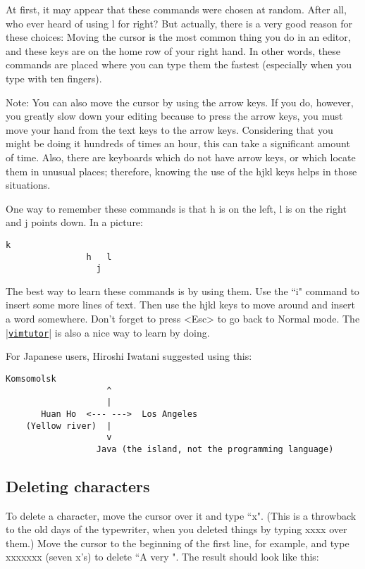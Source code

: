 At first, it may appear that these commands were chosen at random.
After all, who ever heard of using l for right?  But actually, there is a very good reason for these choices: Moving the cursor is the most common thing you do in an editor, and these keys are on the home row of your right hand.
In other words, these commands are placed where you can type them the fastest (especially when you type with ten fingers).

Note:
You can also move the cursor by using the arrow keys.
If you do, however, you greatly slow down your editing because to press the arrow keys, you must move your hand from the text keys to the arrow keys.
Considering that you might be doing it hundreds of times an hour, this can take a significant amount of time.
Also, there are keyboards which do not have arrow keys, or which locate them in unusual places; therefore, knowing the use of the hjkl keys helps in those situations.

One way to remember these commands is that h is on the left, l is on the right and j points down.
In a picture:

\begin{Verbatim}[samepage=true]
				  k
				h   l
				  j
\end{Verbatim}

The best way to learn these commands is by using them.
Use the ``i" command to insert some more lines of text.
Then use the hjkl keys to move around and insert a word somewhere.
Don't forget to press <Esc> to go back to Normal mode.
The \hyperref[vimtutor]{|\texttt{vimtutor}|} is also a nice way to learn by doing.

For Japanese users, Hiroshi Iwatani suggested using this:

\begin{Verbatim}[samepage=true]
                Komsomolsk
                    ^
                    |
       Huan Ho  <--- --->  Los Angeles
    (Yellow river)  |
                    v
                  Java (the island, not the programming language)
\end{Verbatim}

\subsection{Deleting characters}

To delete a character, move the cursor over it and type ``x".
(This is a throwback to the old days of the typewriter, when you deleted things by typing xxxx over them.)
Move the cursor to the beginning of the first line, for example, and type xxxxxxx (seven x's) to delete ``A very ".
The result should look like this:

